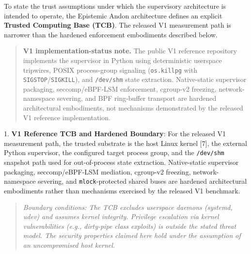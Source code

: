 \documentclass[
  10pt,letterpaper]{article}
\begin{document}
To state the trust assumptions under which the supervisory architecture is
intended to operate, the Epistemic Andon architecture defines an explicit
\textbf{Trusted Computing Base (TCB)}. The released V1 measurement path is
narrower than the hardened enforcement embodiments described below.

\begin{quote}
\textbf{V1 implementation-status note.} The public V1 reference repository
implements the supervisor in Python using deterministic userspace tripwires,
POSIX process-group signaling (\texttt{os.killpg} with
\texttt{SIGSTOP}/\texttt{SIGKILL}), and \texttt{/dev/shm} state extraction.
Native-static supervisor packaging, seccomp/eBPF-LSM enforcement, cgroup-v2
freezing, network-namespace severing, and BPF ring-buffer transport are
hardened architectural embodiments, not mechanisms demonstrated by the
released V1 reference implementation.
\end{quote}

1. \textbf{V1 Reference TCB and Hardened Boundary}: For the released V1
measurement path, the trusted substrate is the host Linux kernel {[}7{]},
the external Python supervisor, the configured target process group, and
the \texttt{/dev/shm} snapshot path used for out-of-process state extraction.
Native-static supervisor packaging, seccomp/eBPF-LSM mediation, cgroup-v2
freezing, network-namespace severing, and \texttt{mlock}-protected shared
buses are hardened architectural embodiments rather than mechanisms exercised
by the released V1 benchmark.

\begin{quote}
\emph{Boundary conditions: The TCB excludes userspace daemons (systemd,
udev) and assumes kernel integrity. Privilege escalation via kernel
vulnerabilities (e.g., dirty-pipe class exploits) is outside the stated
threat model. The security properties claimed here hold under the
assumption of an uncompromised host kernel.}
\end{quote}
\end{document}
